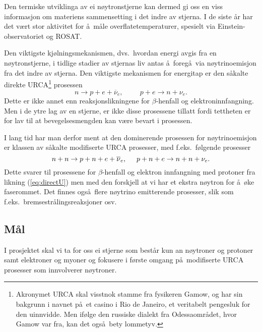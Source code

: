Den termiske utviklinga av ei n\o ytronstjerne kan dermed
gi oss en viss
informasjon om materiens sammensetting i det indre av 
stjerna. I de siste \aa r har det v\ae rt stor aktivitet
for \aa\ m\aa le overflatetemperaturer, spesielt via
Einstein-observatoriet og ROSAT.

Den viktigste kj\o lningsmekanismen, dvs.\ hvordan energi
avgis fra en n\o ytronstjerne, i tidlige stadier av stjernas liv  
antas \aa\ foreg\aa\ via n\o ytrinoemisjon fra det indre av
stjerna.
Den viktigste mekanismen for energitap er den s\aa kalte
direkte URCA\footnote{Akronymet URCA skal visstnok  stamme 
fra fysikeren Gamow,
og har sin bakgrunn i navnet p\aa\ et casino i Rio de Janeiro,
et veritabelt pengesluk for den uinnvidde.
Men if\o lge den russiske dialekt fra Odessaomr\aa det, hvor 
Gamow var fra, kan det ogs\aa\ bety lommetyv.}
 prosessen 
\begin{equation}
    n\rightarrow p +e +\overline{\nu}_e, \hspace{1cm} p+e \rightarrow
    n+\nu_e .
    \label{eq:directU}
\end{equation}
Dette er ikke annet enn reaksjonslikningene for $\beta$-henfall og
elektroninnfangning.
Men i  de ytre lag av en stjerne, 
er ikke disse prosessene tillatt fordi tettheten er for lav 
til at bevegelsesmengden kan v\ae re bevart i prosessen.  

I lang tid har man derfor ment at den dominerende prosessen for 
n\o ytrinoemisjon er klassen av s\aa kalte
modifiserte URCA prosesser, med f.eks.\ f\o lgende prosesser
\begin{equation}
    n+n\rightarrow p+n +e +\overline{\nu}_e,
    \hspace{0.5cm} p+n+e \rightarrow
    n+n+\nu_e .
    \label{eq:ind_neutr}
\end{equation}
Dette svarer til prosessene for  
$\beta$-henfall og elektron innfangning  med  protoner 
fra likning (\ref{eq:directU}) men med den forskjell at vi har 
et ekstra n\o ytron for \aa\ \o ke faserommet.
Det finnes ogs\aa\ flere n\o ytrino emitterende 
prosesser, slik som f.eks.\
bremsestr\aa lingsreaksjoner osv.\

\subsection*{M\aa l}
I prosjektet skal vi ta for oss ei stjerne som best\aa r kun an n\o ytroner
og protoner samt elektroner og myoner
og fokusere i f\o rste omgang p\aa\ modifiserte URCA
prosesser som innvolverer n\o ytroner.

